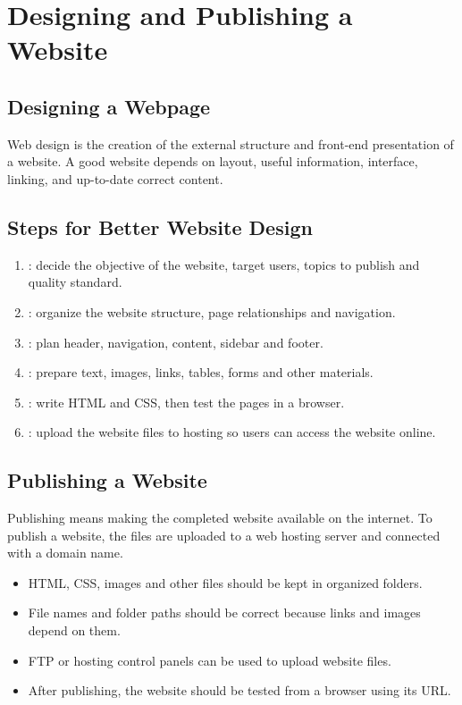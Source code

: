 \section{Designing and Publishing a Website}

\subsection{Designing a Webpage}
Web design is the creation of the external structure and front-end presentation of a website. A good website depends on layout, useful information, interface, linking, and up-to-date correct content.

\subsection{Steps for Better Website Design}
\begin{enumerate}
    \item {}: decide the objective of the website, target users, topics to publish and quality standard.
    \item {}: organize the website structure, page relationships and navigation.
    \item {}: plan header, navigation, content, sidebar and footer.
    \item {}: prepare text, images, links, tables, forms and other materials.
    \item {}: write HTML and CSS, then test the pages in a browser.
    \item {}: upload the website files to hosting so users can access the website online.
\end{enumerate}

\subsection{Publishing a Website}
Publishing means making the completed website available on the internet. To publish a website, the files are uploaded to a web hosting server and connected with a domain name.

\begin{itemize}
    \item HTML, CSS, images and other files should be kept in organized folders.
    \item File names and folder paths should be correct because links and images depend on them.
    \item FTP or hosting control panels can be used to upload website files.
    \item After publishing, the website should be tested from a browser using its URL.
\end{itemize}

